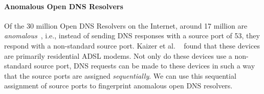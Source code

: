 

\paragraph{Anomalous Open DNS Resolvers}

Of the 30 million Open DNS Resolvers on the Internet, around 17
million are \emph{anomalous}~\cite{anomalousdns}, i.e.,
instead of sending DNS responses with a source port of 53, they
respond with a non-standard source port. Kaizer et al. ~\cite{anomalousdns} found that
these devices are primarily residential ADSL modems. Not only do these
devices use a non-standard source port, DNS requests can be made to
these devices in such a way that the source ports are assigned
\emph{sequentially}. We can use this sequential
assignment of source ports to fingerprint anomalous open DNS resolvers.

